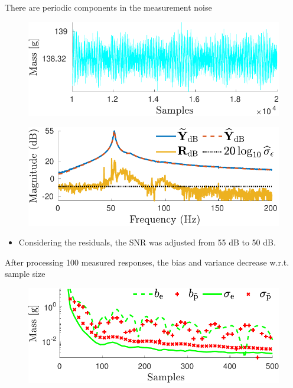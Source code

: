 \documentclass[presentation]{beamer}
\begin{document}
\begin{frame}[label={slide:experimental-validation6}]{There are periodic components \linebreak in the measurement noise}
\begin{figure}
\centering
\includegraphics[width=0.65\columnwidth]{./fig/Exp_Fig_7.pdf} 
\end{figure}
\begin{figure}
\centering 
\includegraphics[width=0.65\columnwidth]{./fig/Exp_Fig_9.pdf} 
\end{figure}
\begin{itemize}
	\color{blue}
	\item Considering the residuals, \linebreak the SNR was adjusted from 55 dB to 50 dB. 
\end{itemize}
\end{frame}

\begin{frame}[label={slide:experimental-validation5}]{After processing 100 measured responses, \linebreak the bias and variance decrease w.r.t. sample size} 
\begin{figure}
 \centering
 \includegraphics[width=0.65\columnwidth]{./fig/Exp_Fig_11.pdf} 
\end{figure}
\end{frame}
\end{document}
